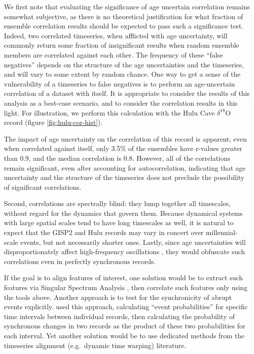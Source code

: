 \documentclass[gchron, manuscript]{copernicus}
\begin{document}
We first note that evaluating the significance of age uncertain correlation remains somewhat subjective, as there is no theoretical justification for what fraction of ensemble correlation results should be expected to pass such a significance test.
Indeed, two correlated timeseries, when afflicted with age uncertainty, will commonly return some fraction of insignificant results when random ensemble members are correlated against each other.
The frequency of these ``false negatives'' depends on the structure of the age uncertainties and the timeseries, and will vary to some extent by random chance.
One way to get a sense of the vulnerability of a timeseries to false negatives is to perform an age-uncertain correlation of a dataset with itself.
It is appropriate to consider the results of this analysis as a best-case scenario, and to consider the correlation results in this light.
For illustration, we perform this calculation with the Hulu Cave \(\delta^{18}\)O record (figure \ref{fig:hulu-cor-hist}).

The impact of age uncertainty on the correlation of this record is apparent; even when correlated against itself, only 3.5\% of the ensembles have r-values greater than 0.9, and the median correlation is 0.8.
However, all of the correlations remain significant, even after accounting for autocorrelation, indicating that age uncertainty and the structure of the timeseries does not preclude the possibility of significant correlations.

Second, correlations are spectrally blind: they lump together all timescales, without regard for the dynamics that govern them. Because dynamical systems with large spatial scales tend to have long timescales as well, it is natural to expect that the GISP2 and Hulu records may vary in concert over millennial-scale events, but not necessarily shorter ones. Lastly, since age uncertainties will disproportionately affect high-frequency oscillations \citep[e.g.][]{BAM}, they would obfuscate such correlations even in perfectly synchronous records.

If the goal is to align features of interest, one solution would be to extract such features via Singular Spectrum Analysis \citep{Vautard89, Vautard1992}, then correlate such features only using the tools above.
Another approach is to test for the synchronicity of abrupt events explicitly.
\citet{blaauw2010were} used this approach, calculating ``event probabilities'' for specific time intervals between individual records, then calculating the probability of synchronous changes in two records as the product of these two probabilities for each interval.
Yet another solution would be to use dedicated methods from the timeseries alignment (e.g.~dynamic time warping) literature.
\end{document}
